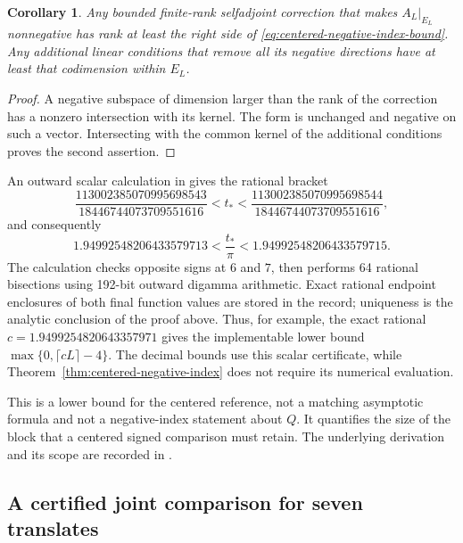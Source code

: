 \documentclass[11pt]{article}
\numberwithin{equation}{section}
\newtheorem{corollary}[theorem]{Corollary}
\theoremstyle{definition}
\theoremstyle{remark}
\begin{document}
\begin{corollary}\label{cor:centered-correction-rank}
Any bounded finite-rank selfadjoint correction that makes \(A_L|_{E_L}\)
nonnegative has rank at least the right side of
\eqref{eq:centered-negative-index-bound}.  Any additional linear
conditions that remove all its negative directions have at least that
codimension within \(E_L\).
\end{corollary}
\begin{proof}
A negative subspace of dimension larger than the rank of the correction
has a nonzero intersection with its kernel.  The form is unchanged and
negative on such a vector.  Intersecting with the common kernel of the
additional conditions proves the second assertion.
\end{proof}

An outward scalar calculation in \cite{JointProbeCertificate} gives the
rational bracket
\begin{equation}\label{eq:centered-root-bracket}
 \frac{113002385070995698543}{18446744073709551616}
 <t_*<
 \frac{113002385070995698544}{18446744073709551616},
\end{equation}
and consequently
\begin{equation}\label{eq:centered-density-bracket}
 1.94992548206433579713
 <\frac{t_*}{\pi}<
 1.94992548206433579715.
\end{equation}
The calculation checks opposite signs at \(6\) and \(7\), then performs
64 rational bisections using 192-bit outward digamma arithmetic.  Exact
rational endpoint enclosures of both final function values are stored
in the record; uniqueness is the analytic conclusion of the proof above.
Thus, for example, the exact rational
\(c=1.9499254820643357971\) gives the implementable lower bound
\(\max\{0,\lceil cL\rceil-4\}\).
The decimal bounds use this scalar certificate, while
Theorem~\ref{thm:centered-negative-index} does not require its numerical
evaluation.

This is a lower bound for the centered reference, not a matching
asymptotic formula and not a negative-index statement about \(Q\).
It quantifies the size of the block that a centered signed comparison
must retain.  The underlying derivation and its scope are recorded in
\cite{CenteredIndexNote}.

\subsection{A certified joint comparison for seven translates}
\label{subsec:seven-source-certificate}
\end{document}
